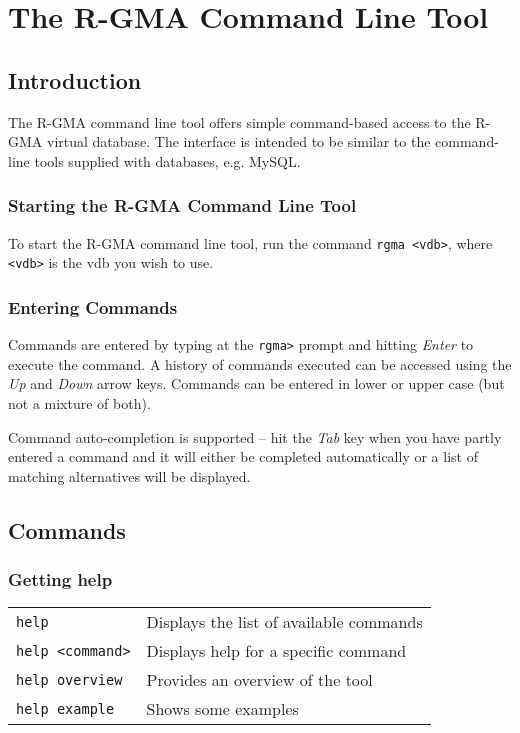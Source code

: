 \section{The R-GMA Command Line Tool}
\label{sec:cl}

\subsection{Introduction}

The R-GMA command line tool offers simple command-based access to the
R-GMA virtual database.  The interface is intended to be similar to
the command-line tools supplied with databases, e.g. MySQL.

\subsubsection{Starting the R-GMA Command Line Tool}

To start the R-GMA command line tool, run the command
\verb|rgma <vdb>|, where \verb|<vdb>| is the vdb you wish to use.


\subsubsection{Entering Commands}

Commands are entered by typing at the \verb/rgma>/ prompt and hitting
\emph{Enter} to execute the command. A history of commands executed can
be accessed using the \emph{Up} and \emph{Down} arrow keys. Commands
can be entered in lower or upper case (but not a mixture of both).

Command auto-completion is supported -- hit the \emph{Tab} key when you
have partly entered a command and it will either be completed
automatically or a list of matching alternatives will be displayed.

\subsection{Commands}

\subsubsection{Getting help}

\begin{tabular*}{15cm}{ll@{\extracolsep{\fill}}}
\verb/help/ & Displays the list of available commands \\
\verb/help <command>/ & Displays help for a specific command \\
\verb/help overview/ & Provides an overview of the tool \\
\verb/help example/ & Shows some examples \\
\end{tabular*}

